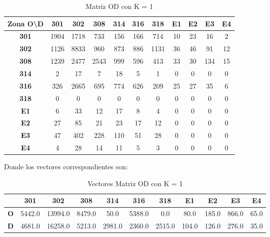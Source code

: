 \documentclass[12pt]{article} %
\begin{document}
\begin{table}[H]
  \centering
  \footnotesize
  \begin{tabular}{c|cccccccccc}    
  \textbf{Zona O\textbackslash D} & \textbf{301} & \textbf{302} & \textbf{308} & \textbf{314} & \textbf{316} & \textbf{318} & \textbf{E1} & \textbf{E2} & \textbf{E3} & \textbf{E4} \\ \hline
  \textbf{301} & 1904 & 1718 & 733 & 156 & 166 & 714 & 10 & 23 & 16 & 2 \\ 
  \textbf{302} & 1126 & 8833 & 960 & 873 & 886 & 1131 & 36 & 46 & 91 & 12 \\ 
  \textbf{308} & 1239 & 2477 & 2543 & 999 & 596 & 413 & 33 & 30 & 134 & 15 \\ 
  \textbf{314} & 2 & 17 & 7 & 18 & 5 & 1 & 0 & 0 & 0 & 0 \\ 
  \textbf{316} & 326 & 2665 & 695 & 774 & 626 & 209 & 25 & 27 & 35 & 6 \\ 
  \textbf{318} & 0 & 0 & 0 & 0 & 0 & 0 & 0 & 0 & 0 & 0 \\ 
  \textbf{E1} & 6 & 33 & 12 & 17 & 8 & 4 & 0 & 0 & 0 & 0 \\ 
  \textbf{E2} & 27 & 85 & 21 & 23 & 17 & 12 & 0 & 0 & 0 & 0 \\ 
  \textbf{E3} & 47 & 402 & 228 & 110 & 51 & 28 & 0 & 0 & 0 & 0 \\ 
  \textbf{E4} & 4 & 28 & 14 & 11 & 5 & 3 & 0 & 0 & 0 & 0 \\ 
  \end{tabular}
  \caption{Matriz OD con K = 1}
  \label{table:M_K1}
\end{table}

Donde los vectores correspondientes son:

\begin{table}[H]
  \centering
  \footnotesize
  \begin{tabular}{c|cccccccccc}    
  \textbf{} & \textbf{301} & \textbf{302} & \textbf{308} & \textbf{314} & \textbf{316} & \textbf{318} & \textbf{E1} & \textbf{E2} & \textbf{E3} & \textbf{E4} \\ \hline
  \textbf{O} & 5442.0 & 13994.0 & 8479.0 & 50.0 & 5388.0 & 0.0 & 80.0 & 185.0 & 866.0 & 65.0 \\ 
  \textbf{D} & 4681.0 & 16258.0 & 5213.0 & 2981.0 & 2360.0 & 2515.0 & 104.0 & 126.0 & 276.0 & 35.0 \\ 
  \end{tabular}
  \caption{Vectores Matriz OD con K = 1}
  \label{table:data_matrix}
\end{table}
\end{document}
